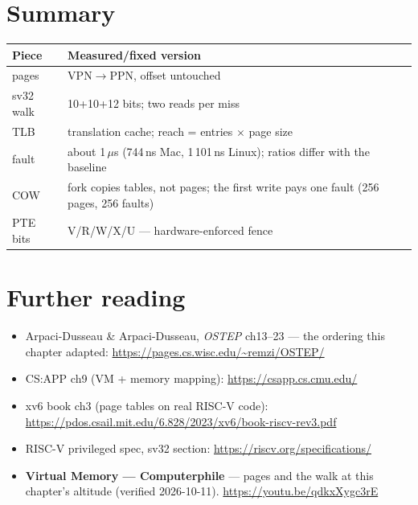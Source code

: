 \section{Summary}
\label{sec:summary11}
\begin{tabularx}{\linewidth}{@{}l X@{}}
\toprule
\textbf{Piece} & \textbf{Measured/fixed version} \\
\midrule
pages     & VPN$\to$PPN, offset untouched \\
sv32 walk & 10+10+12 bits; two reads per miss \\
TLB       & translation cache; reach = entries $\times$ page size \\
fault     & about 1\,$\mu$s (744\,ns Mac, 1\,101\,ns Linux); ratios differ with the baseline \\
COW       & fork copies tables, not pages; the first write pays one fault (256 pages, 256 faults) \\
PTE bits  & V/R/W/X/U --- hardware-enforced fence \\
\bottomrule
\end{tabularx}

\section*{Further reading}
\label{sec:further11}
\begin{itemize}
\item Arpaci-Dusseau \& Arpaci-Dusseau, \emph{OSTEP} ch13--23 ---
      the ordering this chapter adapted:
      \url{https://pages.cs.wisc.edu/~remzi/OSTEP/}
\item CS:APP ch9 (VM + memory mapping):
      \url{https://csapp.cs.cmu.edu/}
\item xv6 book ch3 (page tables on real RISC-V code):
      \url{https://pdos.csail.mit.edu/6.828/2023/xv6/book-riscv-rev3.pdf}
\item RISC-V privileged spec, sv32 section:
      \url{https://riscv.org/specifications/}
\end{itemize}

\begin{rulebox}
\begin{itemize}
\item \textbf{Virtual Memory --- Computerphile} --- pages and the
      walk at this chapter's altitude (verified 2026-10-11).
      \url{https://youtu.be/qdkxXygc3rE}
\end{itemize}
\end{rulebox}

